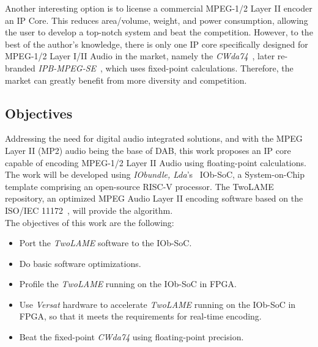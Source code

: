 Another interesting option is to license a commercial MPEG-1/2 Layer II encoder an IP Core. This reduces area/volume, weight, and power consumption, allowing the user to develop a top-notch system and beat the competition. However, to the best of the author's knowledge, there is only one IP core specifically designed for MPEG-1/2 Layer I/II Audio in the market, namely the \textit{CWda74}~\cite{CWda74}, later re-branded \textit{IPB-MPEG-SE}~\cite{ipb-mpeg-se}, which uses fixed-point calculations. Therefore, the market can greatly benefit from more diversity and competition.

\subsection{Objectives}

Addressing the need for digital audio integrated solutions, and with the MPEG Layer II (MP2) audio being the base of DAB, this work proposes an IP core capable of encoding MPEG-1/2 Layer II Audio using floating-point calculations.
The work will be developed using \textit{IObundle, Lda}'s~\cite{iobundle} IOb-SoC, a System-on-Chip template comprising an open-source RISC-V processor. The TwoLAME~\cite{twolame} repository, an optimized MPEG Audio Layer II encoding software based on the ISO/IEC 11172~\cite{11172}, will provide the algorithm.\\
The objectives of this work are the following:

\begin{itemize}
    \item Port the \textit{TwoLAME} software to the IOb-SoC.
    \item Do basic software optimizations.
    \item Profile the \textit{TwoLAME} running on the IOb-SoC in FPGA.
    \item Use \textit{Versat} hardware to accelerate \textit{TwoLAME} running on the IOb-SoC in FPGA, so that it meets the requirements for real-time encoding.
    \item Beat the fixed-point \textit{CWda74} using floating-point precision.
\end{itemize}



